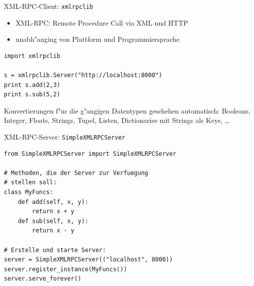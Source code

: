 \begin{frame}[fragile]{XML-RPC-Client: \texttt{xmlrpclib}}
\begin{itemize}
\item XML-RPC: \alert{Remote Procedure Call} via XML und HTTP
\item unabh"anging von Plattform und Programmiersprache
\end{itemize}
\begin{lstlisting}[style=Python]
import xmlrpclib

s = xmlrpclib.Server("http://localhost:8000")
print s.add(2,3) 
print s.sub(5,2) 
\end{lstlisting}
Konvertierungen f"ur die g"angigen Datentypen geschehen automatisch: 
Booleans, Integer, Floats, Strings, Tupel, Listen, Dictionaries mit Strings als Keys, \dots
\end{frame}

\begin{frame}[fragile]{XML-RPC-Server: \texttt{SimpleXMLRPCServer}}
\begin{lstlisting}[style=Python]
from SimpleXMLRPCServer import SimpleXMLRPCServer

# Methoden, die der Server zur Verfuegung
# stellen soll:
class MyFuncs:
    def add(self, x, y):
        return x + y
    def sub(self, x, y):
        return x - y
    
# Erstelle und starte Server:
server = SimpleXMLRPCServer(("localhost", 8000))
server.register_instance(MyFuncs())
server.serve_forever()
\end{lstlisting}
\end{frame}


